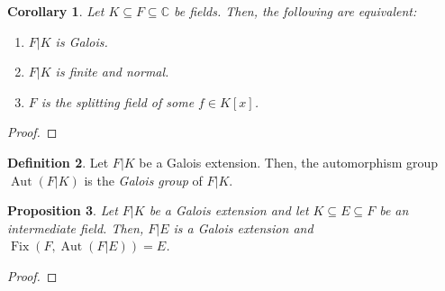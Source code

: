 \documentclass[a4paper, openany]{memoir}
\theoremstyle{definition}
\newtheorem{definition}{Definition}[section]
\theoremstyle{plain}
\newtheorem{proposition}[definition]{Proposition}
\newtheorem{corollary}[definition]{Corollary}
\begin{document}
    \begin{corollary}
        Let $K \subseteq F \subseteq \mathbb{C}$ be fields. Then, the following are equivalent:
        \begin{enumerate}
            \item $F|K$ is Galois.
            \item $F|K$ is finite and normal.
            \item $F$ is the splitting field of some $f \in K[x]$.
        \end{enumerate}
    \end{corollary}
    \begin{proof}
        
    \end{proof}

    \begin{definition}
        Let $F|K$ be a Galois extension. Then, the automorphism group $\operatorname{Aut}(F|K)$ is the \emph{Galois group} of $F|K$.
    \end{definition}

    \begin{proposition}
        Let $F|K$ be a Galois extension and let $K \subseteq E \subseteq F$ be an intermediate field. Then, $F|E$ is a Galois extension and $\operatorname{Fix}(F, \operatorname{Aut}(F|E)) = E$.
    \end{proposition}
    \begin{proof}
        
    \end{proof}
\end{document}
